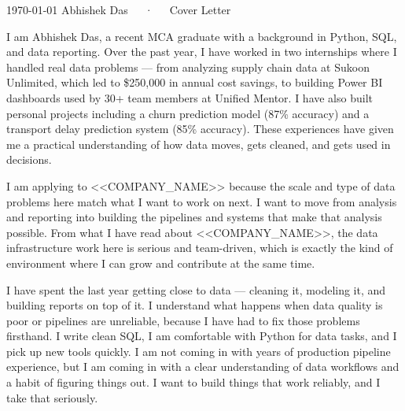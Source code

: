 \documentclass[11pt, a4paper]{awesome-cv}
\begin{document}
\makecvheader[R]

\makecvfooter
  {\today}
  {Abhishek Das~~~·~~~Cover Letter}
  {}

\makelettertitle

\begin{cvletter}

I am Abhishek Das, a recent MCA graduate with a background in Python, SQL, and data reporting. Over the past year, I have worked in two internships where I handled real data problems — from analyzing supply chain data at Sukoon Unlimited, which led to \$250,000 in annual cost savings, to building Power BI dashboards used by 30+ team members at Unified Mentor. I have also built personal projects including a churn prediction model (87\% accuracy) and a transport delay prediction system (85\% accuracy). These experiences have given me a practical understanding of how data moves, gets cleaned, and gets used in decisions.

I am applying to <<COMPANY_NAME>> because the scale and type of data problems here match what I want to work on next. I want to move from analysis and reporting into building the pipelines and systems that make that analysis possible. From what I have read about <<COMPANY_NAME>>, the data infrastructure work here is serious and team-driven, which is exactly the kind of environment where I can grow and contribute at the same time.

I have spent the last year getting close to data — cleaning it, modeling it, and building reports on top of it. I understand what happens when data quality is poor or pipelines are unreliable, because I have had to fix those problems firsthand. I write clean SQL, I am comfortable with Python for data tasks, and I pick up new tools quickly. I am not coming in with years of production pipeline experience, but I am coming in with a clear understanding of data workflows and a habit of figuring things out. I want to build things that work reliably, and I take that seriously.

\end{cvletter}


\makeletterclosing
\end{document}
